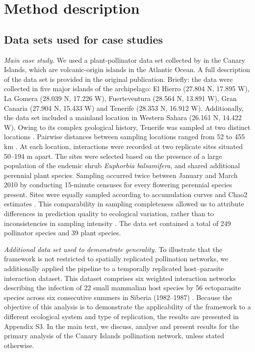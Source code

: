 \documentclass[oneside, a4paper, onecolumn, 11pt]{article}
\newcommand{\revtag}[1]{\textcolor{softcoral}{[#1]}}
\begin{document}
\hfill
\section{Method description}

\subsection{Data sets used for case studies}

\textit{Main case study.} We used a plant-pollinator data set collected by \citet{Trojelsgaard2015-aq} in the Canary Islands, which are volcanic-origin islands in the Atlantic Ocean. 
A full description of the data set is provided in the original publication. 
Briefly: the data were collected in five major islands of the archipelago: El Hierro (27.804 N, 17.895 W), La Gomera  (28.039 N,  17.226 W),  Fuerteventura  (28.564 N,  13.891 W),  Gran  Canaria (27.904 N, 15.433 W) and Tenerife (28.353 N, 16.912 W). 
Additionally, the data set included a mainland location in Western Sahara (26.161  N, 14.422  W). Owing to its complex geological history, Tenerife was sampled at two distinct locations \citep{Trojelsgaard2013-we}. 
Pairwise distances between sampling locations ranged from 52 to 455 km \citep{Trojelsgaard2015-aq,Vitali2024-gt}. 
At each location, interactions were recorded at two replicate sites situated 50–194 m apart. 
The sites were selected based on the presence of a large population of the endemic shrub \textit{Euphorbia balsamifera}, and shared additional perennial plant species. Sampling occurred twice between January and March 2010 by conducting 15-minute censuses for every flowering perennial species present. Sites were equally sampled according to accumulation curves and Chao2 estimates \citep{Trojelsgaard2015-aq}. 
This comparability in sampling completeness allowed us to attribute differences in prediction quality to ecological variation, rather than to inconsistencies in sampling intensity \citep{Vitali2024-gt}. 
The data set contained a total of 249 pollinator species and 39 plant species.

\textit{Additional data set used to demonstrate generality.} To illustrate that the framework is not restricted to spatially replicated pollination networks, we additionally applied the pipeline to a temporally replicated host–parasite interaction dataset. This dataset comprises six weighted interaction networks describing the infection of 22 small mammalian host species by 56 ectoparasite species across six consecutive summers in Siberia (1982–1987) \citep{Krasnov2010-bh,Pilosof2013-fq}. 
Because the objective of this analysis is to demonstrate the applicability of the framework to a different ecological system and type of replication, the results are presented in Appendix S3. In the main text, we discuss, analyse and present results for the primary analysis of the Canary Islands pollination network, unless stated otherwise. %
\end{document}
